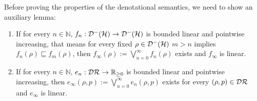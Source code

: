\documentclass[a4paper,UKenglish,cleveref, autoref, thm-restate]{lipics-v2021}
\begin{document}
Before proving the properties of the denotational semantics, we need to show an auxiliary lemma:
\begin{lemma}
    \label{lem:lupislinear}
    \begin{enumerate}
        \item If for every $n\in \mathbb{N}$, $f_n: \mathcal{D}^- (\mathcal{H}) \to \mathcal{D}^- (\mathcal{H})$ is bounded linear and pointwise increasing, that means for every fixed $\rho \in \mathcal{D}^- (\mathcal{H})$ $m>n$ implies $f_n(\rho) \sqsubseteq f_m(\rho)$, then $f_\infty (\rho) := \bigvee_{n=0}^\infty f_n(\rho)$ exists and $f_\infty$ is linear.
        \item If for every $n \in \mathbb{N}$, $e_n:\mathcal{D}\mathcal{R} \to \mathbb{R}_{\geq 0}$ is bounded linear and pointwise increasing, then $e_\infty (\rho,p) := \bigvee_{n=0}^\infty e_n(\rho,p)$ exists for every $(\rho,p) \in \mathcal{D}\mathcal{R}$ and $e_\infty$ is linear.
    \end{enumerate}

\end{lemma}
\end{document}
